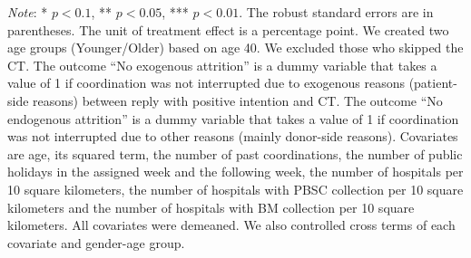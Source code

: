 \documentclass[12pt, a4paper]{article}
\begin{document}
\begin{table}
\begin{threeparttable}
\begin{tabular}[t]{lcccccc}
\bottomrule
\end{tabular}
\begin{tablenotes}
\item \emph{Note}: * $p < 0.1$, ** $p < 0.05$, *** $p < 0.01$. The robust standard errors are in parentheses. The unit of treatment effect is a percentage point. We created two age groups (Younger/Older) based on age 40. We excluded those who skipped the CT. The outcome ``No exogenous attrition'' is a dummy variable that takes a value of 1 if coordination was not interrupted due to exogenous reasons (patient-side reasons) between reply with positive intention and CT. The outcome ``No endogenous attrition'' is a dummy variable that takes a value of 1 if coordination was not interrupted due to other reasons (mainly donor-side reasons). Covariates are age, its squared term, the number of past coordinations, the number of public holidays in the assigned week and the following week, the number of hospitals per 10 square kilometers, the number of hospitals with PBSC collection per 10 square kilometers and the number of hospitals with BM collection per 10 square kilometers. All covariates were demeaned. We also controlled cross terms of each covariate and gender-age group.
\end{tablenotes}
\end{threeparttable}
\end{table}
\end{document}
